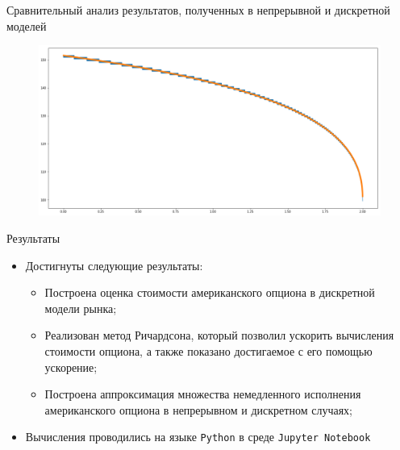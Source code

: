 \documentclass[12pt]{beamer}
\begin{document}
\begin{frame}{Сравнительный анализ результатов, полученных в непрерывной и дискретной моделей}
    \begin{figure}[h]
        \centering
        \includegraphics[scale=0.27]{Together.png}
        \label{together}
    \end{figure} 
\end{frame}

\begin{frame}{Результаты}
    \begin{itemize}
        \item Достигнуты следующие результаты:
        \begin{itemize}
            \item Построена оценка стоимости американского опциона в дискретной модели рынка;
            \item Реализован метод Ричардсона, который позволил ускорить вычисления стоимости опциона, а также показано достигаемое с его помощью ускорение;
            \item Построена аппроксимация множества немедленного исполнения американского опциона в непрерывном и дискретном случаях;
        \end{itemize}
        \item Вычисления проводились на языке \texttt{Python} в среде \texttt{Jupyter Notebook}
    \end{itemize}
\end{frame}
\end{document}
